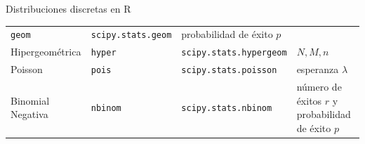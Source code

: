 \documentclass[
  ignorenonframetext,
]{beamer}
\begin{document}
\begin{frame}[fragile]{Distribuciones discretas en R}
\begin{longtable}[]{@{}llll@{}}
\begin{minipage}[t]{0.22\columnwidth}
\texttt{geom}\strut
\end{minipage} & \begin{minipage}[t]{0.22\columnwidth}\raggedright
\texttt{scipy.stats.geom}\strut
\end{minipage} & \begin{minipage}[t]{0.22\columnwidth}\raggedright
probabilidad de éxito \(p\)\strut
\end{minipage}\tabularnewline
\begin{minipage}[t]{0.22\columnwidth}\raggedright
Hipergeométrica\strut
\end{minipage} & \begin{minipage}[t]{0.22\columnwidth}\raggedright
\texttt{hyper}\strut
\end{minipage} & \begin{minipage}[t]{0.22\columnwidth}\raggedright
\texttt{scipy.stats.hypergeom}\strut
\end{minipage} & \begin{minipage}[t]{0.22\columnwidth}\raggedright
\(N,M,n\)\strut
\end{minipage}\tabularnewline
\begin{minipage}[t]{0.22\columnwidth}\raggedright
Poisson\strut
\end{minipage} & \begin{minipage}[t]{0.22\columnwidth}\raggedright
\texttt{pois}\strut
\end{minipage} & \begin{minipage}[t]{0.22\columnwidth}\raggedright
\texttt{scipy.stats.poisson}\strut
\end{minipage} & \begin{minipage}[t]{0.22\columnwidth}\raggedright
esperanza \(\lambda\)\strut
\end{minipage}\tabularnewline
\begin{minipage}[t]{0.22\columnwidth}\raggedright
Binomial Negativa\strut
\end{minipage} & \begin{minipage}[t]{0.22\columnwidth}\raggedright
\texttt{nbinom}\strut
\end{minipage} & \begin{minipage}[t]{0.22\columnwidth}\raggedright
\texttt{scipy.stats.nbinom}\strut
\end{minipage} & \begin{minipage}[t]{0.22\columnwidth}\raggedright
número de éxitos \(r\) y probabilidad de éxito \(p\)\strut
\end{minipage}\tabularnewline
\bottomrule
\end{longtable}
\end{frame}
\end{document}
